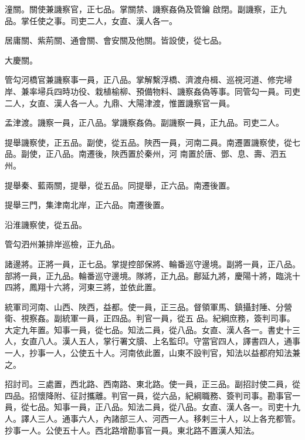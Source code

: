 \begin{pinyinscope}
 潼關。關使兼譏察官，正七品。掌關禁、譏察姦偽及管鑰
 啟閉。副譏察，正九品。掌任使之事。司吏二人，女直、漢人各一。



 居庸關、紫荊關、通會關、會安關及他關。皆設使，從七品。



 大慶關。



 管勾河橋官兼譏察事一員，正八品。掌解繫浮橋、濟渡舟楫、巡視河道、修完埽岸、兼率埽兵四時功役、栽植榆柳、預備物料、譏察姦偽等事。同管勾一員。司吏二人，女直、漢人各一人。九鼎、大陽津渡，惟置譏察官一員。



 孟津渡。譏察一員，正八品。掌譏察姦偽。副譏察一員，正九品。司吏二人。



 提舉譏察使，正五品。副使，從五品。陜西一員，河南二員。南遷置譏察使，從七品。副使，正八品。南遷後，陜西置於秦州，河
 南置於唐、鄧、息、壽、泗五州。



 提舉秦、藍兩關，提舉，從五品。同提舉，正六品。南遷後置。



 提舉三門，集津南北岸，正六品。南遷後置。



 沿淮譏察使，從五品。



 管勾泗州兼排岸巡檢，正九品。



 諸邊將。正將一員，正七品。掌提控部保將、輪番巡守邊境。副將一員，正八品。部將一員，正九品。輪番巡守邊境。隊將，正九品。鄜延九將，慶陽十將，臨洮十四將，鳳翔十六將，河東三將，並依此置。



 統軍司河南、山西、陜西，益都。使一員，正三品。督領軍馬、鎮攝封陲、分營衛、視察姦。副統軍一員，正四品。判官一員，從五
 品。紀綱庶務，簽判司事。大定九年置。知事一員，從七品。知法二員，從八品。女直、漢人各一。書史十三人，女直八人。漢人五人，掌行署文牘、上名監印。守當官四人，譯書四人，通事一人，抄事一人，公使五十人。河南依此置，山東不設判官，知法以益都府知法兼之。



 招討司。三處置，西北路、西南路、東北路。使一員，正三品。副招討使二員，從四品。招懷降附、征討攜離。判官一員，從六品，紀綱職務、簽判司事。勘事官一員，從七品。知事一員，正八品。知法二員，從八品。女直、漢人各一。司吏十九人。譯人三人。通事六人，內諸部三人、河西一人。移剌三十人，以上各充都管。抄事一人。公使五十人。西北路增勘事官一員。東北路不置漢人知法。




\end{pinyinscope}
